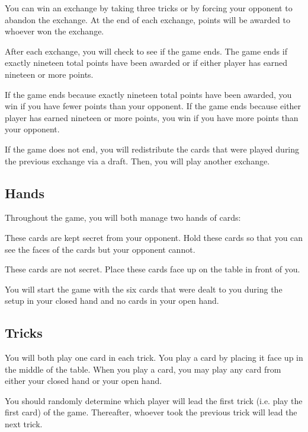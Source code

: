 \documentclass[a6paper, parskip=half, DIV=14, 10pt]{scrartcl}
\begin{document}
You can win an exchange by taking three tricks or by forcing your opponent to abandon the exchange. At the end of each exchange, points will be awarded to whoever won the exchange.

After each exchange, you will check to see if the game ends. The game ends if exactly nineteen total points have been awarded or if either player has earned nineteen or more points.

If the game ends because exactly nineteen total points have been awarded, you win if you have fewer points than your opponent. If the game ends because either player has earned nineteen or more points, you win if you have more points than your opponent.

If the game does not end, you will redistribute the cards that were played during the previous exchange via a draft. Then, you will play another exchange.

\newpage

\subsection*{Hands}
Throughout the game, you will both manage two hands of cards:
\begin{description}[leftmargin=0pt, labelsep=\widthof{\ }]
	\item[Closed Hand \textendash] These cards are kept secret from your opponent. Hold these cards so that you can see the faces of the cards but your opponent cannot.
	\item[Open Hand \textendash] These cards are not secret. Place these cards face up on the table in front of you.
\end{description}
You will start the game with the six cards that were dealt to you during the setup in your closed hand and no cards in your open hand.

\newpage

\subsection*{Tricks}
You will both play one card in each trick. You play a card by placing it face up in the middle of the table. When you play a card, you may play any card from either your closed hand or your open hand.

You should randomly determine which player will lead the first trick (i.e. play the first card) of the game. Thereafter, whoever took the previous trick will lead the next trick.
\end{document}
